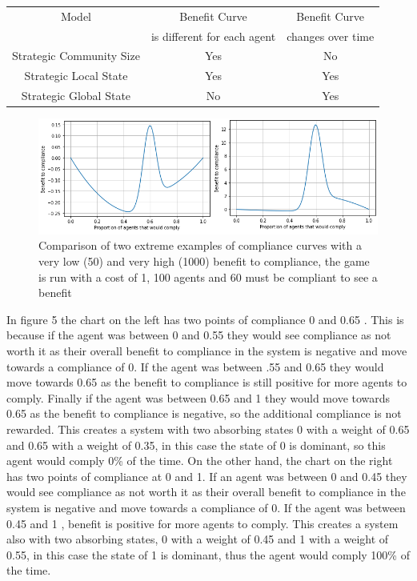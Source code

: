 \documentclass{article}
\begin{document}
\begin{tabular}{|c|c|c|}
\hline
Model & Benefit Curve & Benefit Curve\\ 
&is different for each agent &changes over time \\\hline
Strategic Community Size & Yes & No \\ \hline
Strategic Local State & Yes &Yes\\ \hline
Strategic Global State & No &Yes\\ \hline
\end{tabular}
\newline


\begin{figure}[h!]
\centering
\includegraphics[width=12cm]{strat}
\caption{Comparison of two extreme examples of compliance curves with a very low (50) and very high (1000) benefit to compliance, the game is run with a cost of 1, 100 agents and 60 must be compliant to see a benefit}
\end{figure}

In figure 5 the chart on the left has two points of compliance 0 and 0.65 . This is because if the agent was between 0 and 0.55 they would see compliance as not worth it as their overall benefit to compliance in the system is negative and move towards a compliance of 0. If the agent was between .55 and 0.65 they would move towards 0.65 as the benefit to compliance is still positive for more agents to comply. Finally if the agent was between 0.65 and 1 they would move towards 0.65 as the benefit to compliance is negative, so the additional compliance is not rewarded. This creates a system with two absorbing states 0 with a weight of 0.65 and 0.65 with a weight of 0.35, in this case the state of 0 is dominant, so this agent would comply 0\% of the time. \newline\newline
On the other hand, the chart on the right has two points of compliance at 0 and 1. If an agent was between 0 and 0.45 they would see compliance as not worth it as their overall benefit to compliance in the system is negative and move towards a compliance of 0. If the agent was between 0.45 and 1 , benefit is positive for more agents to comply. This creates a system also with two absorbing states, 0 with a weight of 0.45 and 1 with a weight of 0.55, in this case the state of 1 is dominant, thus the agent would comply 100\% of the time.
\end{document}
